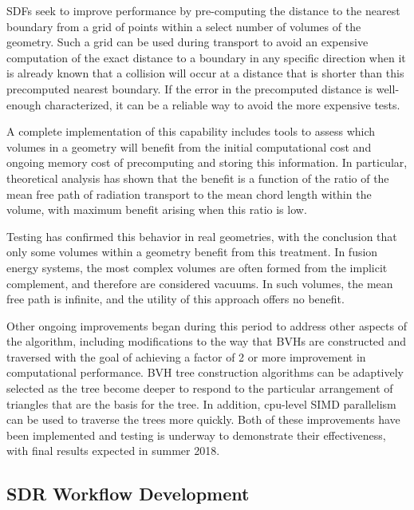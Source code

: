 \glspl{SDF} seek to improve performance by pre-computing the distance to the
nearest boundary from a grid of points within a select number of volumes of
the geometry.  Such a grid can be used during transport to avoid an expensive
computation of the exact distance to a boundary in any specific direction when
it is already known that a collision will occur at a distance that is shorter
than this precomputed nearest boundary.  If the error in the precomputed
distance is well-enough characterized, it can be a reliable way to avoid the
more expensive tests.

A complete implementation of this capability includes tools to assess which
volumes in a geometry will benefit from the initial computational cost and
ongoing memory cost of precomputing and storing this information.  In
particular, theoretical analysis has shown that the benefit is a function of
the ratio of the mean free path of radiation transport to the mean chord
length within the volume, with maximum benefit arising when this ratio is
low\cite{shriwise_NET}.

Testing has confirmed this behavior in real geometries, with the conclusion
that only some volumes within a geometry benefit from this treatment.  In
fusion energy systems, the most complex volumes are often formed from the
implicit complement, and therefore are considered vacuums.  In such volumes,
the mean free path is infinite, and the utility of this approach offers no
benefit.

Other ongoing improvements began during this period to address other aspects
of the algorithm, including modifications to the way that \glspl{BVH} are
constructed and traversed with the goal of achieving a factor of 2 or more
improvement in computational performance.  \gls{BVH} tree construction
algorithms can be adaptively selected as the tree become deeper to respond to
the particular arrangement of triangles that are the basis for the tree.  In
addition, cpu-level \gls{SIMD} parallelism can be used to traverse the trees
more quickly.  Both of these improvements have been implemented and testing is
underway to demonstrate their effectiveness, with final results expected in
summer 2018.

\subsection{\gls{SDR} Workflow Development}

